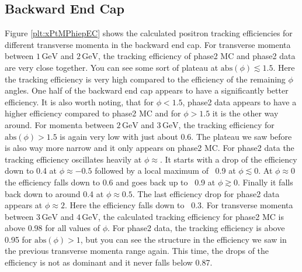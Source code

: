 \documentclass[a4paper,11pt,twosided,final,german,openbib,pdftex,listof=totoc,bibliography=totoc]{scrbook}
\begin{document}
\newpage





\subsection{Backward End Cap}


Figure \ref{plt:xPtMPhiepEC} shows the calculated positron tracking efficiencies for different transverse momenta in the backward end cap. For transverse momenta between $1\,\textrm{GeV}$ and $2\,\textrm{GeV}$, the tracking efficiency of phase2 MC and phase2 data are very close together. You can see some sort of plateau at $\textrm{abs}(\phi) \lesssim 1.5$. Here the tracking efficiency is very high compared to the efficiency of the remaining $\phi$ angles. One half of the backward end cap appears to have a significantly better efficiency. It is also worth noting, that for $\phi <1.5$, phase2 data appears to have a higher efficiency compared to phase2 MC and for $\phi > 1.5$ it is the other way around. For momenta between $2\,\textrm{GeV}$ and $3\,\textrm{GeV}$, the tracking efficiency for $\textrm{abs}(\phi) >1.5$ is again very low with just about 0.6. The plateau we saw before is also way more narrow and it only appears on phase2 MC. For phase2 data the tracking efficiency oscillates heavily at $\phi \approx$. It starts with a drop of the efficiency down to 0.4 at $\phi \approx -0.5$ followed by a local maximum of ~0.9 at $\phi \lesssim 0$. At $\phi \approx 0 $ the efficiency falls down to 0.6 and goes back up to ~0.9 at $\phi \gtrsim 0$. Finally it falls back down to around 0.4 at $\phi \approx 0.5$. The last efficiency drop for phase2 data appears at $\phi \approx 2$. Here the efficiency falls down to ~0.3. For transverse momenta between $3\,\textrm{GeV}$ and $4\,\textrm{GeV}$, the calculated tracking efficiency for phase2 MC is above 0.98 for all values of $\phi$. For phase2 data, the tracking efficiency is above 0.95 for $\textrm{abs}(\phi) > 1$, but you can see the structure in the efficiency we saw in the previous transverse momenta range again. This time, the drops of the efficiency is not as dominant and it never falls below 0.87.
\end{document}
